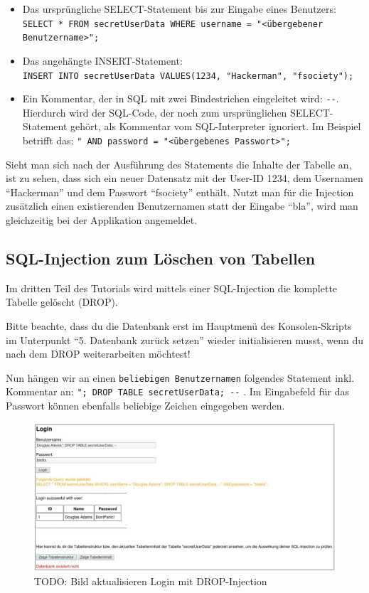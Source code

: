 \begin{itemize}
	\item Das ursprüngliche SELECT-Statement bis zur Eingabe eines Benutzers:  \colorbox{altgray}{\lstinline|SELECT * FROM secretUserData WHERE username = "<übergebener Benutzername>";|}
	\item Das angehängte INSERT-Statement:\\ \colorbox{altgray}{\lstinline|INSERT INTO secretUserData VALUES(1234, "Hackerman", "fsociety");|}
	\item Ein Kommentar, der in SQL mit zwei Bindestrichen eingeleitet wird: \colorbox{altgray}{\lstinline|--|}. Hierdurch wird der SQL-Code, der noch zum ursprünglichen SELECT-Statement gehört, als Kommentar vom SQL-Interpreter ignoriert. Im Beispiel betrifft das: \colorbox{altgray}{\lstinline|" AND password = "<übergebenes Passwort>";|}
\end{itemize}

Sieht man sich nach der Ausführung des Statements die Inhalte der Tabelle an, ist zu sehen, dass sich ein neuer Datensatz mit der User-ID 1234, dem Usernamen \enquote{Hackerman} und dem Passwort \enquote{fsociety} enthält. Nutzt man für die Injection zusätzlich einen existierenden Benutzernamen statt der Eingabe \enquote{bla}, wird man gleichzeitig bei der Applikation angemeldet.

\subsection{SQL-Injection zum Löschen von Tabellen}
Im dritten Teil des Tutorials wird mittels einer SQL-Injection die komplette Tabelle gelöscht (DROP).
 
Bitte beachte, dass du die Datenbank erst im Hauptmenü des Konsolen-Skripts im Unterpunkt \enquote{5. Datenbank zurück setzen} wieder initialisieren musst, wenn du nach dem DROP weiterarbeiten möchtest! 
 
Nun hängen wir an einen \colorbox{altgray}{\lstinline|beliebigen Benutzernamen|} folgendes Statement inkl. Kommentar an: \colorbox{altgray}{\lstinline|"; DROP TABLE secretUserData; --|} . Im Eingabefeld für das Passwort können ebenfalls beliebige Zeichen eingegeben werden.
 
\begin{figure}[H]
	\centering
	\includegraphics[width=\textwidth]{images/SQL_Injection/drop_injection.jpg}
	\caption{TODO: Bild aktualisieren Login mit DROP-Injection}
	\label{fig:drop_injection}
\end{figure}


